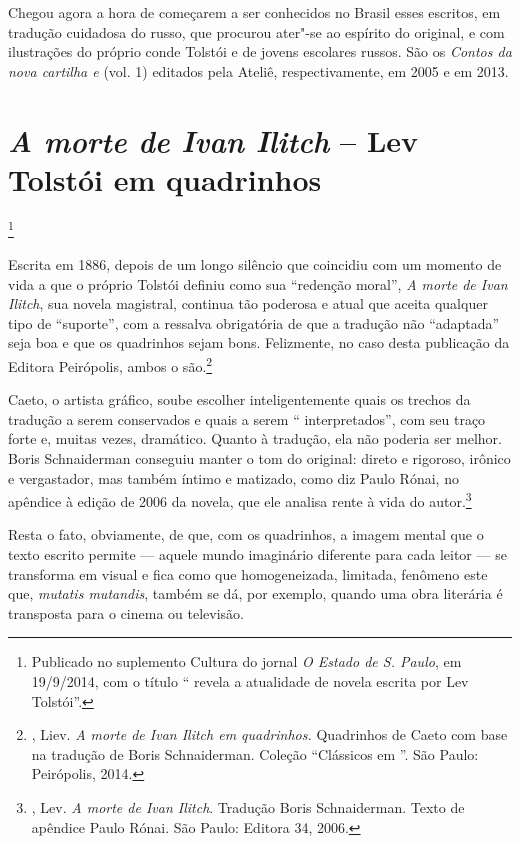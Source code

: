 Chegou agora a hora de começarem a ser conhecidos no Brasil esses
escritos, em tradução cuidadosa do russo, que procurou ater"-se
ao espírito do original, e com ilustrações do próprio conde
Tolstói e de jovens escolares russos. São os \emph{Contos da
nova cartilha  e } (vol. 1) editados pela
Ateliê, respectivamente, em 2005 e em 2013.



\chapter{\emph{A morte de Ivan Ilitch} -- Lev Tolstói em quadrinhos}\footnote{Publicado no suplemento Cultura do jornal \emph{O Estado de S. Paulo}, em 19/9/2014, com o título `` revela a atualidade de novela escrita por Lev Tolstói''.}

Escrita em 1886, depois de um longo silêncio que coincidiu
com um momento de vida a que o próprio Tolstói definiu como
sua ``redenção moral'', \emph{A morte de Ivan Ilitch}, sua
novela magistral, continua tão poderosa e atual que aceita
qualquer tipo de ``suporte'', com a ressalva obrigatória de que
a tradução não ``adaptada'' seja boa e que os quadrinhos sejam
bons. Felizmente, no caso desta publicação da Editora Peirópolis,
ambos o são.\footnote{, Liev. \emph{A morte de
Ivan Ilitch em quadrinhos.} Quadrinhos de Caeto com base na
tradução de Boris Schnaiderman. Coleção ``Clássicos em
''. São Paulo: Peirópolis, 2014.} 

Caeto, o artista gráfico, soube escolher inteligentemente quais os
trechos da tradução a serem conservados e quais a serem ``
interpretados'', com seu traço forte e, muitas vezes, dramático.
Quanto à tradução, ela não poderia ser melhor. Boris Schnaiderman
conseguiu manter o tom do original: direto e rigoroso, irônico e
vergastador, mas também íntimo e matizado, como diz Paulo Rónai,
no apêndice à edição de 2006 da novela, que ele analisa rente à
vida do autor.\footnote{, Lev. \emph{A morte de
Ivan Ilitch}. Tradução Boris Schnaiderman. Texto de apêndice
Paulo Rónai. São Paulo: Editora 34, 2006.}

Resta o fato, obviamente, de que, com os quadrinhos, a imagem
mental que o texto escrito permite --- aquele mundo imaginário
diferente para cada leitor --- se transforma em visual e fica
como que homogeneizada, limitada, fenômeno este que, \emph{mutatis
mutandis}, também se dá, por exemplo, quando uma obra literária é
transposta para o cinema ou televisão.

